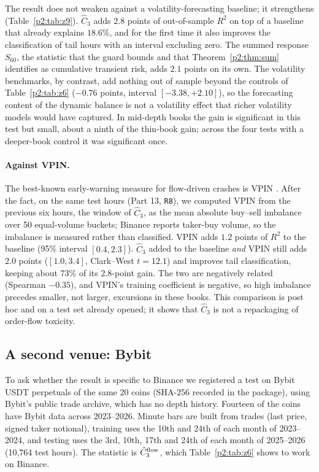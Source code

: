 The result does not weaken against a volatility-forecasting baseline; it strengthens (Table~\ref{p2:tab:z9}). $\hat C_3$ adds $2.8$ points of out-of-sample $R^2$ on top of a baseline that already explains $18.6\%$, and for the first time it also improves the classification of tail hours with an interval excluding zero. The summed response $S_{60}$, the statistic that the guard bounds and that Theorem~\ref{p2:thm:sum} identifies as cumulative transient risk, adds $2.1$ points on its own. The volatility benchmarks, by contrast, add nothing out of sample beyond the controls of Table~\ref{p2:tab:z6} ($-0.76$ points, interval $[-3.38,+2.10]$), so the forecasting content of the dynamic balance is not a volatility effect that richer volatility models would have captured. In mid-depth books the gain is significant in this test but small, about a ninth of the thin-book gain; across the four tests with a deeper-book control it was significant once.

\paragraph{Against VPIN.} The best-known early-warning measure for flow-driven crashes is VPIN \citep{p2:easley2012}. After the fact, on the same test hours (Part 13, \texttt{R8}), we computed VPIN from the previous six hours, the window of $\hat C_3$, as the mean absolute buy--sell imbalance over 50 equal-volume buckets; Binance reports taker-buy volume, so the imbalance is measured rather than classified. VPIN adds $1.2$ points of $R^2$ to the baseline (95\% interval $[0.4,2.3]$). $\hat C_3$ added to the baseline \emph{and} VPIN still adds $2.0$ points ($[1.0,3.4]$, Clark--West $t=12.1$) and improves tail classification, keeping about 73\% of its $2.8$-point gain. The two are negatively related (Spearman $-0.35$), and VPIN's training coefficient is negative, so high imbalance precedes smaller, not larger, excursions in these books. This comparison is post hoc and on a test set already opened; it shows that $\hat C_3$ is not a repackaging of order-flow toxicity.

\subsection{A second venue: Bybit}\label{p2:sec:bybit}
To ask whether the result is specific to Binance we registered a test on Bybit USDT perpetuals of the same 20 coins (SHA-256 recorded in the package), using Bybit's public trade archive, which has no depth history. Fourteen of the coins have Bybit data across 2023--2026. Minute bars are built from trades (last price, signed taker notional), training uses the 10th and 24th of each month of 2023--2024, and testing uses the 3rd, 10th, 17th and 24th of each month of 2025--2026 (10{,}764 test hours). The statistic is $\hat C_3^{\rm flow}$, which Table~\ref{p2:tab:z6} shows to work on Binance.

